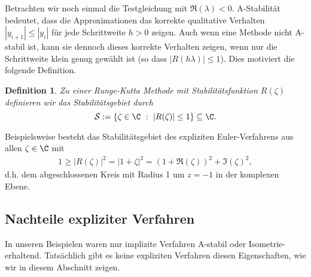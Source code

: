 \documentclass[
]{mycourse}
\theoremstyle{mythm}
\newtheorem{definition}[theorem]{Definition}
\theoremstyle{break}
\begin{document}
Betrachten wir noch einmal die Testgleichung mit $\Re(\lambda)<0$. A-Stabilität bedeutet, dass die Approximationen das 
korrekte qualitative Verhalten 
$|y_{i+1}|\leq |y_i|$ für jede Schrittweite $h>0$ zeigen. Auch wenn eine Methode nicht A-stabil ist, kann sie dennoch dieses
korrekte Verhalten zeigen, wenn nur die Schrittweite klein genug gewählt ist (so dass $|R(h\lambda)|\leq 1$).
Dies motiviert die folgende Definition.

\begin{definition}
Zu einer Runge-Kutta Methode mit Stabilitätsfunktion $R(\zeta)$ definieren wir 
das \emph{Stabilitätsgebiet} durch 
\[
\mathcal S:=\left\{ \zeta\in \C\ : \ |R(\zeta)|\leq 1\right\}\subseteq \C.
\]
\end{definition}

Beispielsweise besteht das Stabilitätsgebiet des expliziten Euler-Verfahrens 
aus allen $\zeta\in \C$ mit
\begin{align*}
1\geq |R(\zeta)|^2=|1+\zeta|^2=(1+\Re(\zeta))^2+\Im(\zeta)^2,
\end{align*}
d.h. dem abgeschlossenen Kreis mit Radius 1 um $z=-1$ in der komplexen Ebene. 





\subsection{Nachteile expliziter Verfahren}\label{subsect:limit_expl}

In unseren Beispielen waren nur implizite Verfahren A-stabil oder Isometrie-erhaltend. Tatsächlich
gibt es keine expliziten Verfahren diesen Eigenschaften, wie wir in diesem Abschnitt zeigen.
\end{document}
